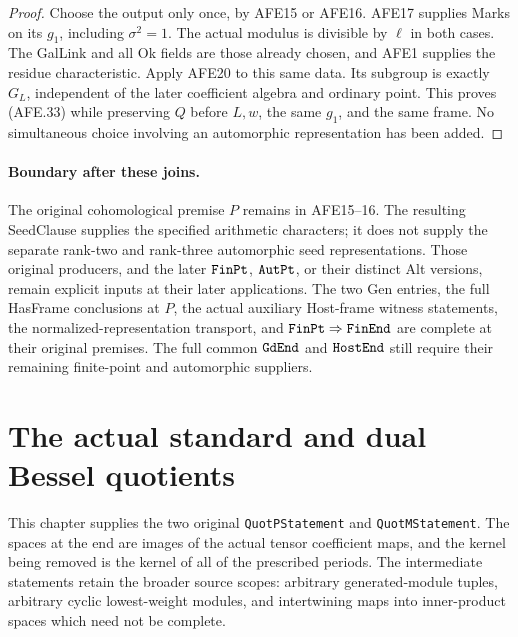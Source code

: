 \documentclass[11pt,a4paper]{article}
\numberwithin{equation}{section}
\theoremstyle{remark}\newtheorem{remark}[theorem]{Remark}
\begin{document}
\begin{proof}
Choose the output only once, by AFE15 or AFE16.
AFE17 supplies Marks on its \(g_1\), including
\(\sigma^2=1\).
The actual modulus is divisible by \(\ell\) in
both cases.  The GalLink and all Ok fields are
those already chosen, and AFE1 supplies the
residue characteristic.
Apply AFE20 to this same data.
Its subgroup is exactly \(G_L\), independent of
the later coefficient algebra and ordinary point.
This proves (AFE.33) while preserving \(Q\) before
\(L,w\), the same \(g_1\), and the same frame.
No simultaneous choice involving an automorphic
representation has been added.
\end{proof}

\paragraph{Boundary after these joins.}
The original cohomological premise \(P\) remains in
AFE15--16.  The resulting SeedClause supplies the
specified arithmetic characters; it does not supply
the separate rank-two and rank-three automorphic
seed representations.  Those original producers,
and the later \(\texttt{Fin\allowbreak Pt}\), \(\texttt{Aut\allowbreak Pt}\),
or their distinct Alt versions, remain explicit
inputs at their later applications.  The two Gen
entries, the full HasFrame conclusions at \(P\),
the actual auxiliary Host-frame witness statements,
the normalized-representation transport, and
\(\texttt{Fin\allowbreak Pt}\Rightarrow\texttt{Fin\allowbreak End}\)
are complete at their original premises.
The full common \(\texttt{Gd\allowbreak End}\) and
\(\texttt{Host\allowbreak End}\) still require their remaining
finite-point and automorphic suppliers.


\section{The actual standard and dual Bessel quotients}
\label{sec:bessel-quotient-suppliers-v52}

This chapter supplies the two original \texttt{Quot\allowbreak PStatement} and
\texttt{Quot\allowbreak MStatement}.  The spaces at the end are images of the actual
tensor coefficient maps, and the kernel being removed is the kernel of
all of the prescribed periods.  The intermediate statements retain the
broader source scopes: arbitrary generated-module tuples, arbitrary
cyclic lowest-weight modules, and intertwining maps into inner-product
spaces which need not be complete.
\end{document}
